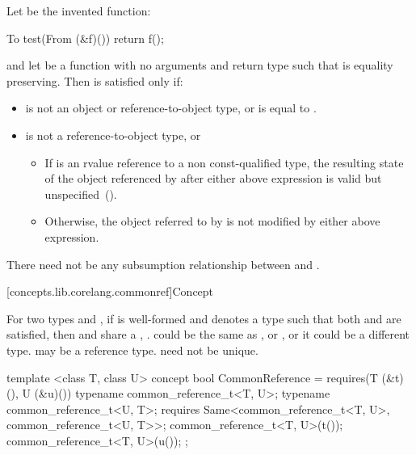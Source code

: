 \begin{itemdescr}
\pnum
Let  be the invented function:
\begin{codeblock}
To test(From (&f)()) {
  return f();
}
\end{codeblock}
and let  be a function with no arguments and return type 
such that  is equality preserving. Then
 is satisfied only if:

\begin{itemize}
\item
{} is not an object or reference-to-object type, or
 is equal to .

\item
{} is not a reference-to-object type, or

\begin{itemize}
\item
If  is an rvalue reference to a non const-qualified type, the resulting state of the object referenced by  after either above expression is valid but unspecified~().

\item
Otherwise, the object referred to by  is not modified by either above expression.
\end{itemize}

\end{itemize}

\pnum
There need not be any subsumption relationship between 
and .
\end{itemdescr}


[concepts.lib.corelang.commonref]{Concept }

\pnum
For two types  and , if 
is well-formed and denotes a type  such that both
 and  are
satisfied, then  and  share a , . \enternote {} could be the same as , or
, or it could be a different type.  may be a reference
type.  need not be unique.\exitnote

%
\begin{itemdecl}
template <class T, class U>
concept bool CommonReference =
  requires(T (&t)(), U (&u)()) {
    typename common_reference_t<T, U>;
    typename common_reference_t<U, T>;
    requires Same<common_reference_t<T, U>,
                  common_reference_t<U, T>>;
    common_reference_t<T, U>(t());
    common_reference_t<T, U>(u());
  };
\end{itemdecl}


